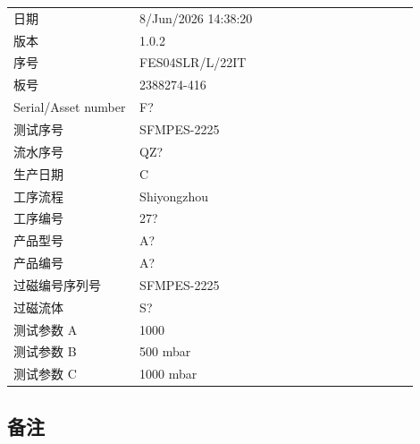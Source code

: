 \documentclass[UTF8,10pt,a4paper,fontset=fandol]{ctexart}
\newcommand{\fieldvalue}[1]{#1}
\begin{document}
\begin{tabular}{@{}p{0.28\linewidth}p{0.62\linewidth}@{}}
日期 &
\fieldvalue{8/Jun/2026 14:38:20}
\\
版本 &
\fieldvalue{1.0.2}
\\
序号 &
\fieldvalue{FES04SLR/L/22IT}
\\
板号 &
\fieldvalue{2388274-416}
\\
Serial/Asset number &
\fieldvalue{F?}
\\
测试序号 &
\fieldvalue{SFMPES-2225}
\\
流水序号 &
\fieldvalue{QZ?}
\\
生产日期 &
\fieldvalue{C}
\\
工序流程 &
\fieldvalue{Shiyongzhou}
\\
工序编号 &
\fieldvalue{27?}
\\
产品型号 &
\fieldvalue{A?}
\\
产品编号 &
\fieldvalue{A?}
\\
过磁编号序列号 &
\fieldvalue{SFMPES-2225}
\\
过磁流体 &
\fieldvalue{S?}
\\
测试参数 A &
\fieldvalue{1000}
\\
测试参数 B &
\fieldvalue{500 mbar}
\\
测试参数 C &
\fieldvalue{1000 mbar}
\end{tabular}

\bigskip

\subsection{备注}
\end{document}
